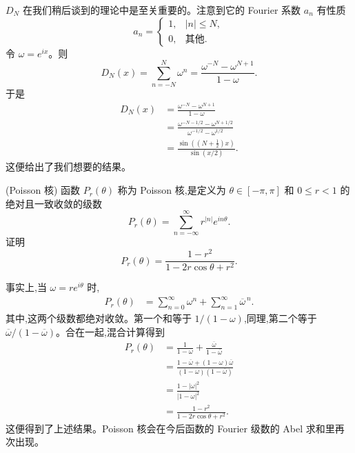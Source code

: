 \begin{solution}
	$D_N$ 在我们稍后谈到的理论中是至关重要的。注意到它的 Fourier 系数 $a_n$ 有性质
	\[
	a_n=
	\begin{cases}
		1,& |n|\leq N,\\
		0,& \text{其他}.
	\end{cases}
	\]
	令 $\omega=e^{ix}$。则
	\[
	D_N(x)=\sum_{n=-N}^{N}\omega^n
	=\frac{\omega^{-N}-\omega^{N+1}}{1-\omega}.
	\]
	于是
	\[
	\begin{aligned}
		D_N(x)
		&=\frac{\omega^{-N}-\omega^{N+1}}{1-\omega}                                      \\
		&=\frac{\omega^{-N-1/2}-\omega^{N+1/2}}{\omega^{-1/2}-\omega^{1/2}}                 \\
		&=\frac{\sin\left((N+\frac12)x\right)}{\sin(x/2)}.
	\end{aligned}
	\]
	这便给出了我们想要的结果。
\end{solution}

\begin{example}(Poisson 核)
	函数 $P_r(\theta)$ 称为 Poisson 核,是定义为 $\theta\in[-\pi,\pi]$ 和 $0\leq r<1$ 的绝对且一致收敛的级数
	\[
	P_r(\theta)=\sum_{n=-\infty}^{\infty}r^{|n|}e^{in\theta}.
	\]
	证明
	\[
	P_r(\theta)=\frac{1-r^2}{1-2r\cos\theta+r^2}.
	\]
\end{example}

\begin{solution}
	事实上,当 $\omega=re^{i\theta}$ 时,
	\[
	\begin{aligned}
		P_r(\theta)
		&=\sum_{n=0}^{\infty}\omega^n+
		\sum_{n=1}^{\infty}\overline{\omega}^{\,n}.
	\end{aligned}
	\]
	其中,这两个级数都绝对收敛。第一个和等于 $1/(1-\omega)$,同理,第二个等于 $\overline{\omega}/(1-\overline{\omega})$。合在一起,混合计算得到
	\[
	\begin{aligned}
		P_r(\theta)
		&=\frac1{1-\omega}+\frac{\overline{\omega}}{1-\overline{\omega}}                         \\
		&=\frac{1-\overline{\omega}+(1-\omega)\overline{\omega}}
		{(1-\omega)(1-\overline{\omega})}                                                         \\
		&=\frac{1-|\omega|^2}{|1-\omega|^2}                                                        \\
		&=\frac{1-r^2}{1-2r\cos\theta+r^2}.
	\end{aligned}
	\]
	这便得到了上述结果。Poisson 核会在今后函数的 Fourier 级数的 Abel 求和里再次出现。
\end{solution}

